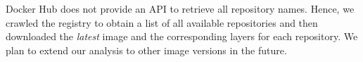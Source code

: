 Docker Hub does not provide an API to retrieve all repository names.
Hence, we crawled the registry to obtain a list of all available repositories
and then downloaded the \emph{latest} image and the corresponding layers for
each repository.
%
%
%
We plan to extend our analysis to other image versions in the future.
%
%
%
%

